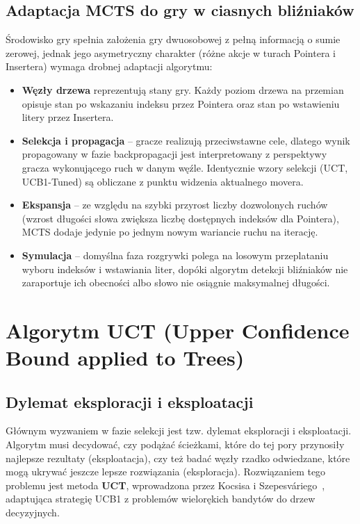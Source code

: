 \documentclass{article}
\begin{document}
\subsection{Adaptacja MCTS do gry w ciasnych bliźniaków}

Środowisko gry spełnia założenia gry dwuosobowej z pełną informacją
o sumie zerowej, jednak jego asymetryczny charakter (różne akcje
w turach Pointera i Insertera) wymaga drobnej adaptacji algorytmu:

\begin{itemize}
    \item \textbf{Węzły drzewa} reprezentują stany gry. Każdy poziom drzewa
    na przemian opisuje stan po wskazaniu indeksu przez Pointera oraz stan
    po wstawieniu litery przez Insertera.
    \item \textbf{Selekcja i propagacja} -- gracze realizują przeciwstawne
    cele, dlatego wynik propagowany w fazie backpropagacji jest
    interpretowany z perspektywy gracza wykonującego ruch w danym węźle.
    Identycznie wzory selekcji (UCT, UCB1-Tuned) są obliczane z punktu
    widzenia aktualnego movera.
    \item \textbf{Ekspansja} -- ze względu na szybki przyrost liczby
    dozwolonych ruchów (wzrost długości słowa zwiększa liczbę dostępnych
    indeksów dla Pointera), MCTS dodaje jedynie po jednym nowym wariancie
    ruchu na iterację.
    \item \textbf{Symulacja} -- domyślna faza rozgrywki polega na losowym
    przeplataniu wyboru indeksów i wstawiania liter, dopóki algorytm
    detekcji bliźniaków nie zaraportuje ich obecności albo słowo nie
    osiągnie maksymalnej długości.
\end{itemize}

\section{Algorytm UCT (Upper Confidence Bound applied to Trees)}

\subsection{Dylemat eksploracji i eksploatacji}
Głównym wyzwaniem w fazie selekcji jest tzw. dylemat eksploracji
i eksploatacji. Algorytm musi decydować, czy podążać ścieżkami, które do
tej pory przynosiły najlepsze rezultaty (eksploatacja), czy też badać
węzły rzadko odwiedzane, które mogą ukrywać jeszcze lepsze rozwiązania
(eksploracja). Rozwiązaniem tego problemu jest metoda \textbf{UCT},
wprowadzona przez Kocsisa i Szepesváriego~\cite{Kocsis2006}, adaptująca
strategię UCB1 z problemów wielorękich bandytów do drzew decyzyjnych.
\end{document}
